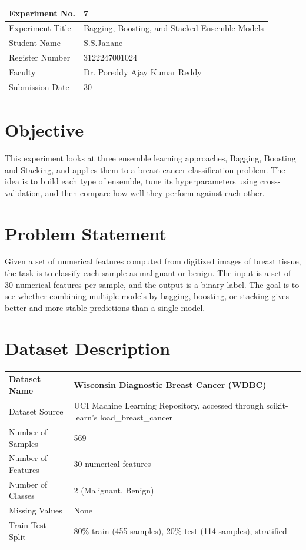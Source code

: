 \documentclass[12pt,a4paper]{article}
\begin{document}
\begin{tabular}{|p{4cm}|p{11cm}|}
\hline
Experiment No. & 7 \\ \hline
Experiment Title & Bagging, Boosting, and Stacked Ensemble Models
\\ \hline
Student Name & S.S.Janane\\ \hline
Register Number & 3122247001024 \\ \hline
Faculty & Dr. Poreddy Ajay Kumar Reddy \\ \hline
Submission Date & 30\8\2026\\ \hline
\end{tabular}

\section{Objective}
This experiment looks at three ensemble learning approaches, Bagging, Boosting and Stacking, and applies them to a breast cancer classification problem. The idea is to build each type of ensemble, tune its hyperparameters using cross-validation, and then compare how well they perform against each other.

\section{Problem Statement}
Given a set of numerical features computed from digitized images of breast tissue, the task is to classify each sample as malignant or benign. The input is a set of 30 numerical features per sample, and the output is a binary label. The goal is to see whether combining multiple models by bagging, boosting, or stacking gives better and more stable predictions than a single model.

\section{Dataset Description}
\begin{longtable}{|p{6cm}|p{8cm}|}
\hline
Dataset Name & Wisconsin Diagnostic Breast Cancer (WDBC) \\ \hline
Dataset Source & UCI Machine Learning Repository, accessed through scikit-learn's load\_breast\_cancer \\ \hline
Number of Samples & 569 \\ \hline
Number of Features & 30 numerical features \\ \hline
Number of Classes & 2 (Malignant, Benign) \\ \hline
Missing Values & None \\ \hline
Train-Test Split & 80\% train (455 samples), 20\% test (114 samples), stratified \\ \hline
\end{longtable}
\end{document}
